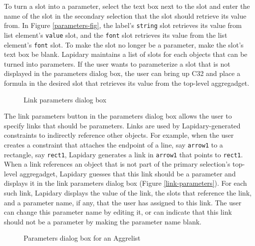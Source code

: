 \begin{itemize}
To turn a slot into a parameter, select the text box next to the slot
and enter the name of the slot in the
secondary selection that the slot should retrieve its value from.
In Figure \ref{parameters-fig}, the label's {\tt string} slot
retrieves its value from list element's {\tt value} slot,
and the {\tt font} slot retrieves its value from the list element's
{\tt font} slot. To
make the slot no longer be a parameter, make the slot's text box be blank.
Lapidary maintains a list of slots for each objects that can be turned
into parameters. If the user wants to parameterize a slot that is not
displayed in the parameters dialog box, the user can bring up C32 and
place a formula in the desired slot that retrieves its value from the
top-level aggregadget.

\begin{figure}
\begin{center}
\end{center}
\caption{Link parameters dialog box}
\end{figure}

The link parameters button in the parameters dialog box allows the user
to specify links that should be parameters.
Links are used by Lapidary-generated
constraints to indirectly reference other objects. For example, when
the user creates a constraint that attaches the endpoint of a line,
say {\tt arrow1} to a rectangle, say {\tt rect1},
Lapidary generates a link in
{\tt arrow1} that points to {\tt rect1}. When a link references an object that
is not part of the primary selection's top-level aggregadget, Lapidary
guesses that this link should be a parameter and displays it in the
link parameters dialog box (Figure \ref{link-parameters}). For each such
link, Lapidary displays the value of the link, the slots that reference
the link, and a parameter name, if any, that the user has assigned to this
link. The user can change this parameter name by editing it, or can
indicate that this link should not be a parameter by making the parameter
name blank.


\begin{figure}
\begin{center}
\end{center}
\caption{Parameters dialog box for an Aggrelist}
\end{figure}


\end{itemize}
